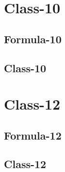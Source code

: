 \documentclass[journal]{IEEEtran}
\begin{document}
\newpage


\tableofcontents

\newpage
\onecolumn


\renewcommand{\thetable}{\theenumi}

\section{Class-10}
\subsection{Formula-10}

\subsection{Class-10}

\section{Class-12}
\subsection{Formula-12}

\subsection{Class-12}

\end{document}
